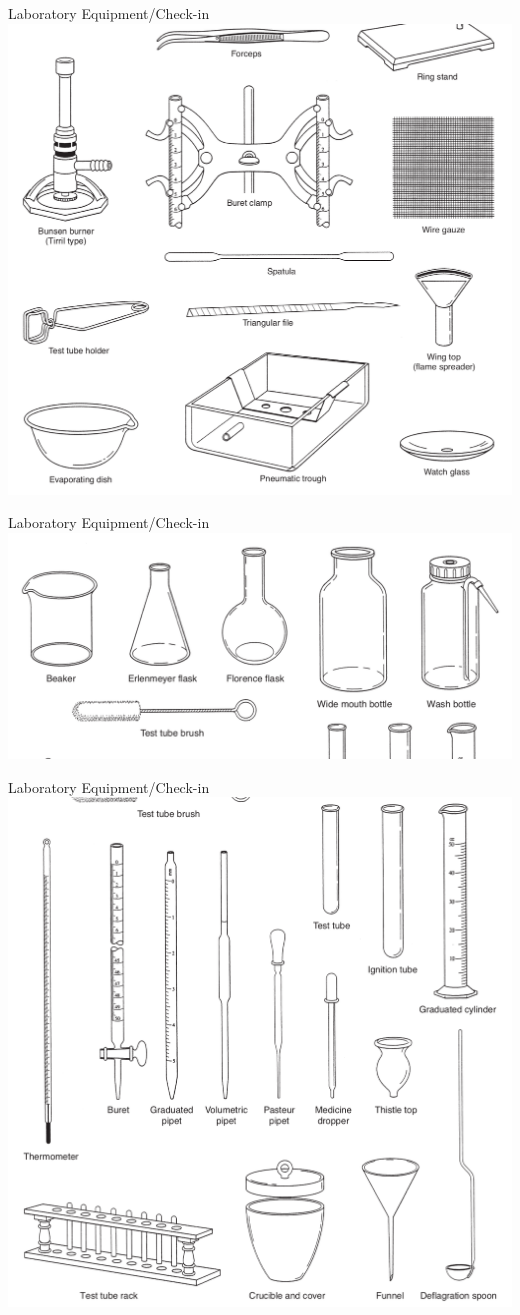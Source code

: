 \documentclass[11pt]{beamer}
\begin{document}
\begin{frame}{Laboratory Equipment/Check-in}
  \centering
  \includegraphics[width=0.8\linewidth]{equip_lab2}
\end{frame}

\begin{frame}{Laboratory Equipment/Check-in}
  \centering
  \includegraphics[width=\linewidth]{equip_lab3}
\end{frame}

\begin{frame}{Laboratory Equipment/Check-in}
  \centering
  \includegraphics[width=0.7\linewidth]{equip_lab4}
\end{frame}
\end{document}
